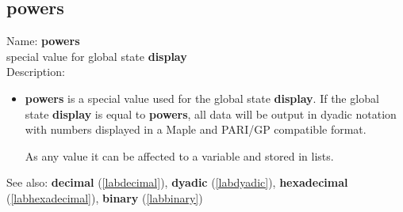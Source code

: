 \subsection{powers}
\label{labpowers}
\noindent Name: \textbf{powers}\\
special value for global state \textbf{display}\\
\noindent Description: \begin{itemize}

\item \textbf{powers} is a special value used for the global state \textbf{display}.  If
   the global state \textbf{display} is equal to \textbf{powers}, all data will be
   output in dyadic notation with numbers displayed in a Maple and
   PARI/GP compatible format.
    
   As any value it can be affected to a variable and stored in lists.
\end{itemize}
See also: \textbf{decimal} (\ref{labdecimal}), \textbf{dyadic} (\ref{labdyadic}), \textbf{hexadecimal} (\ref{labhexadecimal}), \textbf{binary} (\ref{labbinary})
